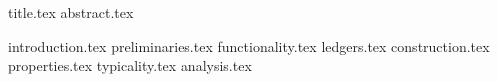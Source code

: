\documentclass[11pt]{llncs}
\begin{document}
{title.tex}
{abstract.tex}

\thispagestyle{plain}

{introduction.tex}
{preliminaries.tex}
{functionality.tex}
{ledgers.tex}
{construction.tex}
{properties.tex}
{typicality.tex}
{analysis.tex}



\end{document}
